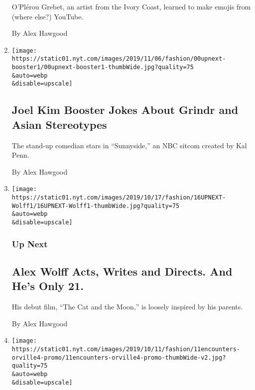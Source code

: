 \begin{enumerate}
  O'Plérou Grebet, an artist from the Ivory Coast, learned to make
  emojis from (where else?) YouTube.

  By Alex Hawgood
\item
  \href{/2019/11/09/style/joel-kim-booster-comedian-sunnyside.html}{}

  \texttt{[image: https://static01.nyt.com/images/2019/11/06/fashion/00upnext-booster1/00upnext-booster1-thumbWide.jpg?quality=75\\\&auto=webp\\\&disable=upscale]}

  \hypertarget{joel-kim-booster-jokes-about-grindr-and-asian-stereotypes}{%
  \subsection{Joel Kim Booster Jokes About Grindr and Asian
  Stereotypes}\label{joel-kim-booster-jokes-about-grindr-and-asian-stereotypes}}

  The stand-up comedian stars in ``Sunnyside,'' an NBC sitcom created by
  Kal Penn.

  By Alex Hawgood
\item
  \href{/2019/10/16/style/alex-wolff-acts-writes-and-directs-and-hes-only-21.html}{}

  \texttt{[image: https://static01.nyt.com/images/2019/10/17/fashion/16UPNEXT-Wolff1/16UPNEXT-Wolff1-thumbWide.jpg?quality=75\\\&auto=webp\\\&disable=upscale]}

  \hypertarget{up-next-1}{%
  \subsubsection{Up Next}\label{up-next-1}}

  \hypertarget{alex-wolff-acts-writes-and-directs-and-hes-only-21}{%
  \subsection{Alex Wolff Acts, Writes and Directs. And He's Only
  21.}\label{alex-wolff-acts-writes-and-directs-and-hes-only-21}}

  His debut film, ``The Cat and the Moon,'' is loosely inspired by his
  parents.

  By Alex Hawgood
\item
  \href{/2019/10/12/style/orville-peck-a-masked-gay-country-music.html}{}

  \texttt{[image: https://static01.nyt.com/images/2019/10/11/fashion/11encounters-orville4-promo/11encounters-orville4-promo-thumbWide-v2.jpg?quality=75\\\&auto=webp\\\&disable=upscale]}


\end{enumerate}
